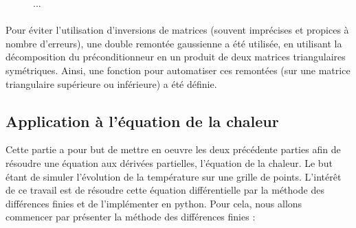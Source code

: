 \documentclass{article}
\begin{document}
\begin{figure}[h]
    \centering
    \caption{...}
    \label{fig:conj_precond}
\end{figure}

\paragraph{}
    Pour éviter l'utilisation d'inversions de matrices (souvent imprécises et propices à nombre d'erreurs), une double remontée gaussienne a été utilisée, en utilisant la décomposition du préconditionneur en un produit de deux matrices triangulaires symétriques. Ainsi, une fonction pour automatiser ces remontées (sur une matrice triangulaire supérieure ou inférieure) a été définie.
    
    
\subsection*{Application à l’équation de la chaleur}
    Cette partie a pour but de mettre en oeuvre les deux précédente parties 
    afin de résoudre une équation aux dérivées partielles, l'équation de la chaleur. 
    Le but étant de simuler l'évolution de la température sur une grille de points. 
    L’intérêt de ce travail est de résoudre cette équation différentielle par la méthode des 
    différences finies et de l’implémenter en python.
    Pour cela, nous allons commencer par présenter la méthode des différences finies : 
\end{document}
